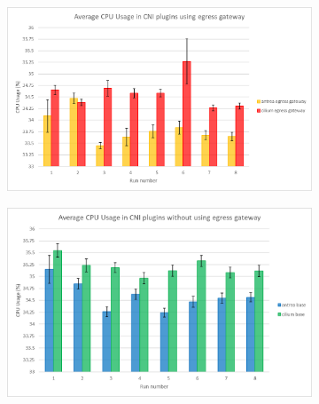 \begin{figure}[H]
    \centering
    \begin{subfigure}[b]{0.45\textwidth}
        \includegraphics[width=\textwidth]{plots/small/cpu_egress.png}
        \caption{}
        \label{fig:cpu_a}
    \end{subfigure}
    \hfill
    \begin{subfigure}[b]{0.45\textwidth}
        \includegraphics[width=\textwidth]{plots/small/cpu_base.png}
        \caption{}
        \label{fig:cpu_b}
    \end{subfigure}
    
    \vspace{10pt}
    

\end{figure}
